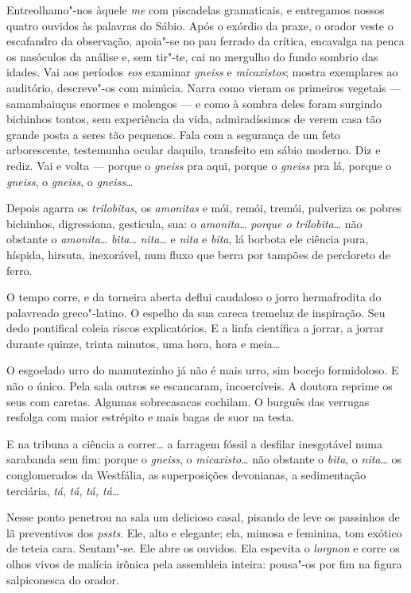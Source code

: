 Entreolhamo"-nos àquele \emph{me} com piscadelas gramaticais, e
entregamos nossos quatro ouvidos às palavras do Sábio. Após o exórdio da
praxe, o orador veste o escafandro da observação, apoia"-se no pau
ferrado da crítica, encavalga na penca os nasóculos da análise e, sem
tir"-te, cai no mergulho do fundo sombrio das idades. Vai aos períodos
\emph{eos} examinar \emph{gneiss} e \emph{micaxistos}; mostra exemplares
ao auditório, descreve"-os com minúcia. Narra como vieram os primeiros
vegetais --- samambaiuçus enormes e molengos --- e como à sombra deles
foram surgindo bichinhos tontos, sem experiência da vida, admiradíssimos
de verem casa tão grande posta a seres tão pequenos. Fala com a
segurança de um feto arborescente, testemunha ocular daquilo, transfeito
em sábio moderno. Diz e rediz. Vai e volta --- porque o \emph{gneiss}
pra aqui, porque o \emph{gneiss} pra lá, porque o \emph{gneiss}, o
\emph{gneiss}, o \emph{gneiss}\ldots{}

Depois agarra os \emph{trilobitas}, os \emph{amonitas} e mói, remói,
tremói, pulveriza os pobres bichinhos, digressiona, gesticula, sua: o
\emph{amonita}\ldots{} \emph{porque o trilobita}\ldots{} não obstante o
\emph{amonita}\ldots{} \emph{bita}\ldots{} \emph{nita}\ldots{} e \emph{nita} e
\emph{bita}, lá borbota ele ciência pura, híspida, hirsuta, inexorável,
num fluxo que berra por tampões de percloreto de ferro.

O tempo corre, e da torneira aberta deflui caudaloso o jorro
hermafrodita do palavreado greco"-latino. O espelho da sua careca
tremeluz de inspiração. Seu dedo pontifical coleia riscos explicatórios.
E a linfa científica a jorrar, a jorrar durante quinze, trinta minutos,
uma hora, hora e meia\ldots{}

O esgoelado urro do mamutezinho já não é mais urro, sim bocejo
formidoloso. E não o único. Pela sala outros se escancaram,
incoercíveis. A doutora reprime os seus com caretas. Algumas
sobrecasacas cochilam. O burguês das verrugas resfolga com maior
estrépito e mais bagas de suor na testa.

E na tribuna a ciência a correr\ldots{} a farragem fóssil a desfilar
inesgotável numa sarabanda sem fim: porque o \emph{gneiss}, o
\emph{micaxisto}\ldots{} não obstante o \emph{bita}, o \emph{nita}\ldots{} os
conglomerados da Westfália, as superposições devonianas, a sedimentação
terciária, \emph{tá}, \emph{tá}, \emph{tá, tá}\ldots{}

Nesse ponto penetrou na sala um delicioso casal, pisando de leve os
passinhos de lã preventivos dos \emph{pssts}. Ele, alto e elegante; ela,
mimosa e feminina, tom exótico de teteia cara. Sentam"-se. Ele abre os
ouvidos. Ela espevita o \emph{lorgnon} e corre os olhos vivos de malícia
irônica pela assembleia inteira: pousa"-os por fim na figura salpiconesca
do orador.

